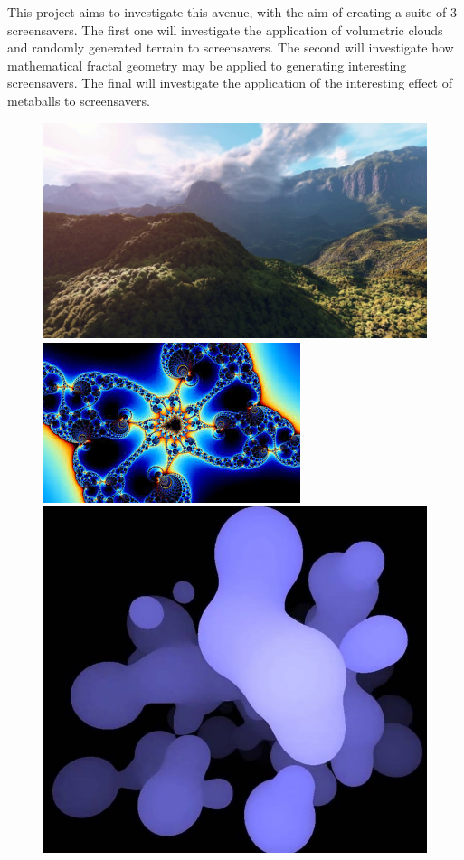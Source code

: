 \documentclass[10pt, openany]{book}
\begin{document}
This project aims to investigate this avenue, with the aim of creating a suite of 3 screensavers. The first one will investigate the application of volumetric clouds and randomly generated terrain to screensavers. The second will investigate how mathematical fractal geometry may be applied to generating interesting screensavers. The final will investigate the application of the interesting effect of metaballs to screensavers. 

\begin{figure}[H]
\centering
\begin{minipage}{.3\textwidth}
  \centering
  \includegraphics[width=.9\linewidth]{rainforest}
\end{minipage}%
\begin{minipage}{.3\textwidth}
  \centering
  \includegraphics[width=.9\linewidth]{mandelbrot}
\end{minipage}%
\begin{minipage}{.3\textwidth}
  \centering
  \includegraphics[width=.7\linewidth]{metaballs}

\end{minipage}
\end{figure}
\end{document}
